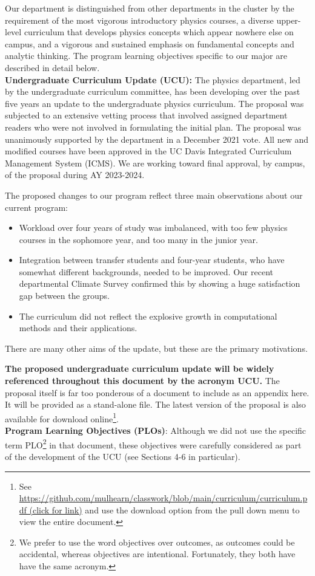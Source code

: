 \documentclass[12pt]{article}
\begin{document}
Our department is distinguished from other departments in the cluster
by the requirement of the most vigorous introductory physics courses,
a diverse upper-level curriculum that develops physics concepts which
appear nowhere else on campus, and a vigorous and sustained emphasis
on fundamental concepts and analytic thinking.  The program learning
objectives specific to our major are described in detail below.\\[3pt]

\noindent
{\bf Undergraduate Curriculum Update (UCU):}
The physics department, led by the undergraduate curriculum committee,
has been developing over the past five years an update to the
undergraduate physics curriculum.  The proposal was subjected to an
extensive vetting process that involved assigned department readers
who were not involved in formulating the initial plan.  The proposal
was unanimously supported by the department in a December 2021 vote.
All new and modified courses have been approved in the UC Davis
Integrated Curriculum Management System (ICMS).  We are working toward
final approval, by campus, of the proposal during AY 2023-2024.

The proposed changes to our program reflect three main observations
about our current program:
\begin{itemize}
 \item Workload over four years of study was imbalanced, with too few
   physics courses in the sophomore year, and too many in the junior
   year.
 \item Integration between transfer students and four-year students,
   who have somewhat different backgrounds, needed to be improved. Our
   recent departmental Climate Survey confirmed this by showing a huge
   satisfaction gap between the groups.
 \item The curriculum did not reflect the explosive growth in
   computational methods and their applications.
\end{itemize}

There are many other aims of the update, but these are the primary
motivations.

{\bf The proposed undergraduate curriculum update will be widely
  referenced throughout this document by the acronym UCU.}  The
proposal itself is far too ponderous of a document to include as an
appendix here.  It will be provided as a stand-alone file.  The latest
version of the proposal is also available for download
online\footnote{ See
  \href{https://github.com/mulhearn/classwork/blob/main/curriculum/curriculum.pdf}
  {https://github.com/mulhearn/classwork/blob/main/curriculum/curriculum.pdf
    (click for link)} and use the download option from the pull down menu to view
  the entire document.  }.\\[3pt]
\noindent
{\bf Program Learning Objectives (PLOs)}: Although we did not use the
specific term PLO\footnote{We prefer to use the word objectives over
  outcomes, as outcomes could be accidental, whereas objectives are
  intentional.  Fortunately, they both have have the same acronym.} in
that document, these objectives were carefully considered as part of
the development of the UCU (see Sections 4-6 in particular).
\end{document}
